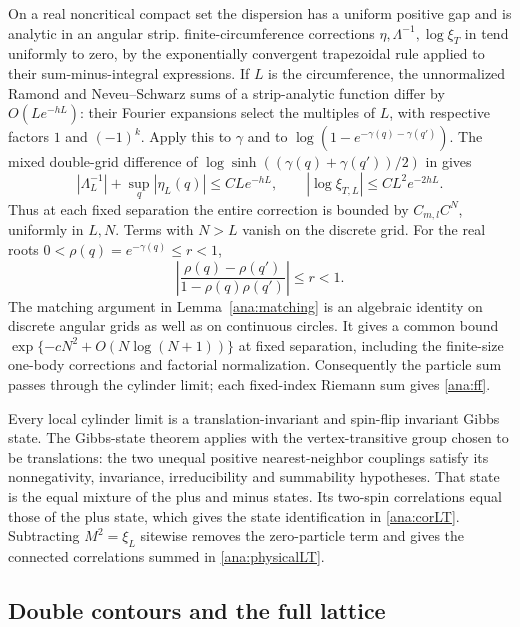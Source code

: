 \documentclass[11pt]{article}
\numberwithin{equation}{section}
\theoremstyle{definition}
\begin{document}
On a real noncritical compact set the dispersion has a uniform
positive gap and is analytic in an angular strip.
finite-circumference corrections \(\eta,\Lambda^{-1},\log\xi_T\)
in \cite{BL} tend uniformly to zero, by the exponentially convergent
trapezoidal rule applied to their sum-minus-integral expressions.
If \(L\) is the circumference, the unnormalized Ramond and
Neveu--Schwarz sums of a strip-analytic function differ by
\(O(Le^{-hL})\): their Fourier expansions select the multiples of
\(L\), with respective factors \(1\) and \((-1)^k\).
Apply this to \(\gamma\) and to
\(\log(1-e^{-\gamma(q)-\gamma(q')})\). The mixed double-grid
difference of \(\log\sinh((\gamma(q)+\gamma(q'))/2)\) in
\cite[(25)]{BL} gives
\[
 |\Lambda_L^{-1}|+\sup_q|\eta_L(q)|\le CLe^{-hL},\qquad
 |\log\xi_{T,L}|\le CL^2e^{-2hL}.
\]
Thus at each fixed separation the entire correction is bounded by
\(C_{m,l}C^N\), uniformly in \(L,N\). Terms with \(N>L\)
vanish on the discrete grid.
For the real roots \(0<\rho(q)=e^{-\gamma(q)}\le r<1\),
\[
 \left|\frac{\rho(q)-\rho(q')}{1-\rho(q)\rho(q')}\right|\le r<1.
\]
The matching argument in Lemma~\ref{ana:matching} is an algebraic
identity on discrete angular grids as well as on continuous circles.
It gives a common bound
\(\exp\{-cN^2+O(N\log(N+1))\}\) at fixed separation, including
the finite-size one-body corrections and factorial normalization.
Consequently the particle sum passes through the cylinder limit;
each fixed-index Riemann sum gives \eqref{ana:ff}.

Every local cylinder limit is a translation-invariant and spin-flip
invariant Gibbs state. The Gibbs-state theorem
\cite[Theorem 1]{Raoufi} applies with the vertex-transitive group
chosen to be translations: the two unequal positive nearest-neighbor
couplings satisfy its nonnegativity, invariance, irreducibility and
summability hypotheses. That state is the equal mixture of the plus
and minus states. Its two-spin correlations equal those of the plus
state, which gives the state identification in \eqref{ana:corLT}.
Subtracting \(M^2=\xi_L\) sitewise removes the zero-particle term and
gives the connected correlations summed in \eqref{ana:physicalLT}.

\subsection{Double contours and the full lattice}
\label{ana:double}
\end{document}
